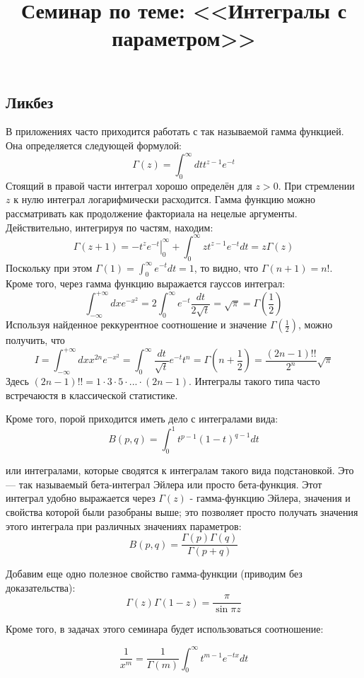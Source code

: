 \documentclass[a4paper,12pt]{article}
\begin{document}
\title{Семинар по теме: <<Интегралы с параметром>>}
\maketitle

\subsection*{Ликбез}
В приложениях часто приходится работать с так называемой гамма функцией. Она определяется следующей формулой:
$$
\Gamma(z)=\int_0^{\infty}dt t^{z-1} e^{-t}
$$
Стоящий в правой части интеграл хорошо определён для $z>0$. При стремлении $z$ к нулю интеграл логарифмически расходится. Гамма функцию можно рассматривать как продолжение факториала на нецелые аргументы. Действительно, интегрируя по частям, находим:
$$
\Gamma(z+1)=-\left.t^z e^{-t}\right|_{0}^{\infty} + \int_0^{\infty}zt^{z-1}e^{-t}dt=z\Gamma(z)
$$
Поскольку при этом $\Gamma(1)=\int_{0}^{\infty}e^{-t}dt=1$, то видно, что $\Gamma(n+1)=n!$. Кроме того, через гамма функцию выражается гауссов интеграл:
$$
\int_{-\infty}^{+\infty}dx e^{-x^2}=2\int_{0}^{\infty}e^{-t}\frac{dt}{2\sqrt{t}}=\sqrt{\pi}=\Gamma\left(\frac{1}{2}\right)
$$
Используя найденное реккурентное соотношение и значение $\Gamma\left(\frac{1}{2}\right)$, можно получить, что 
$$
I=\int_{-\infty}^{+\infty}dx x^{2n}e^{-x^2}=\int_{0}^{\infty}\frac{dt}{\sqrt{t}} e^{-t} t^{n}=\Gamma\left(n+\frac{1}{2}\right)=\frac{(2n-1)!!}{2^{n}}\sqrt{\pi}
$$
Здесь $(2n-1)!!=1\cdot 3\cdot 5\cdot...\cdot(2n-1)$. Интегралы такого типа часто встречаюстя в классической статистике.

\noindent
Кроме того, порой приходится иметь дело с интегралами вида:
\[
B(p,q)=\int_{0}^{1}t^{p-1}(1-t)^{q-1}dt
\]

\noindent
или интегралами, которые сводятся к интегралам такого вида подстановкой.
Это --- так называемый бета-интеграл Эйлера или просто бета-функция.
Этот интеграл удобно выражается через $\Gamma(z)$ - гамма-функцию
Эйлера, значения и свойства которой были разобраны выше; это позволяет просто получать значения этого интеграла
при различных значениях параметров:
\[
B(p,q)=\frac{\Gamma(p)\Gamma(q)}{\Gamma(p+q)}
\]

\noindent
Добавим еще одно полезное свойство гамма-функции (приводим без доказательства):
\[
\Gamma(z)\Gamma(1-z)=\frac{\pi}{\sin\pi z}
\]

\noindent
Кроме того, в задачах этого семинара будет использоваться соотношение:

$$
\frac{1}{x^{m}}	=\frac{1}{\Gamma(m)}\int_{0}^{\infty}t^{m-1}e^{-tx}dt
$$
\end{document}
